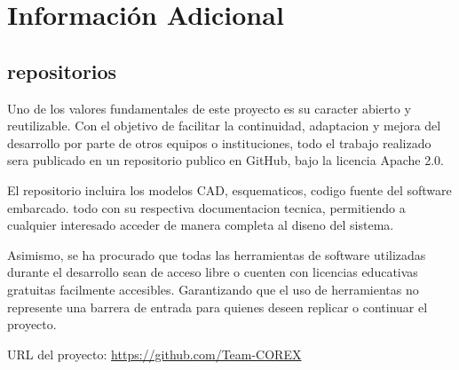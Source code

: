 \chapter{Información Adicional}

\section{repositorios}

Uno de los valores fundamentales de este proyecto es su caracter abierto y reutilizable.
Con el objetivo de facilitar la continuidad, adaptacion y mejora del desarrollo por parte
de otros equipos o instituciones, todo el trabajo realizado sera publicado en un repositorio
publico en GitHub, bajo la licencia Apache 2.0.

El repositorio incluira los modelos CAD, esquematicos, codigo fuente del software
embarcado. todo con su respectiva documentacion tecnica, permitiendo a cualquier interesado
acceder de manera completa al diseno del sistema.

Asimismo, se ha procurado que todas las herramientas de software utilizadas durante
el desarrollo sean de acceso libre o cuenten con licencias educativas gratuitas facilmente
accesibles. Garantizando que el uso de herramientas no represente una barrera de
entrada para quienes deseen replicar o continuar el proyecto.

URL del proyecto: \url{https://github.com/Team-COREX}
